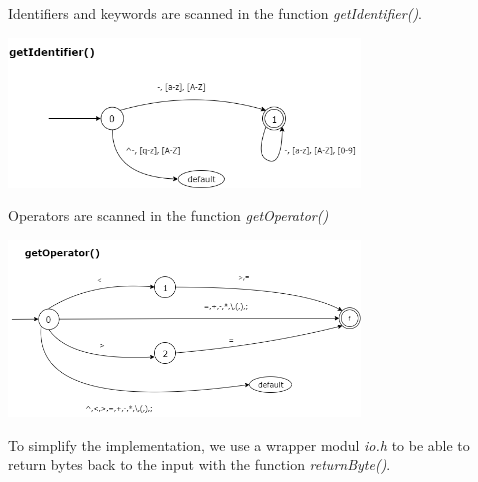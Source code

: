 \documentclass[10pt,a4paper,titlepage]{article}
\begin{document}
\begin{justify}
Identifiers and keywords are scanned in the function \textit{getIdentifier()}.
\end{justify}
\begin{center}
  \includegraphics[width=0.7\textwidth]{img/getIdentifier.png}
\end{center}

\begin{justify}
Operators are scanned in the function \textit{getOperator()}
\end{justify}
\begin{center}
  \includegraphics[width=0.7\textwidth]{img/getOperator.png}
\end{center}

\begin{justify}
To simplify the implementation, we use a wrapper modul \textit{io.h} to
be able to return bytes back to the input with the function \textit{returnByte()}.
\end{justify}

\newpage
\end{document}
